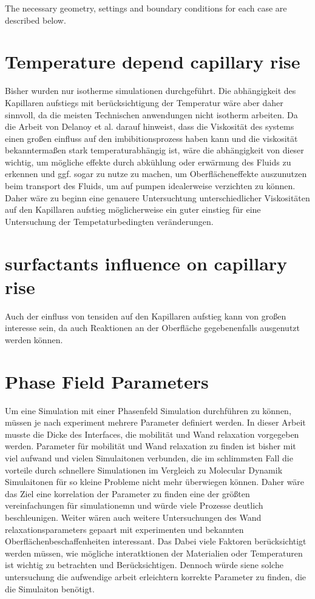 The necessary geometry, settings and boundary conditions for each case are described below. 

\section{Temperature depend capillary rise}
Bisher wurden nur isotherme simulationen durchgeführt. Die abhängigkeit des Kapillaren aufstiegs mit berücksichtigung der Temperatur wäre aber daher sinnvoll, da die meisten Technischen anwendungen nicht isotherm arbeiten. Da die Arbeit von Delanoy et al. \cite{delannoy2019DualRoleViscosity} darauf hinweist, dass die Viskosität des systems einen großen einfluss auf den imbibitionsprozess haben kann und die viskosität bekanntermaßen stark temperaturabhängig ist, wäre die abhängigkeit von dieser wichtig, um mögliche effekte durch abkühlung oder erwärmung des Fluids zu erkennen und ggf. sogar zu nutze zu machen, um Oberflächeneffekte auszunutzen beim transport des Fluids, um auf pumpen idealerweise verzichten zu können. 
Daher wäre zu beginn eine genauere Untersuchtung unterschiedlicher Viskositäten auf den Kapillaren aufstieg möglicherweise ein guter einstieg für eine Untersuchung der Tempetaturbedingten veränderungen. 


\section{surfactants influence on capillary rise}
Auch der einfluss von tensiden auf den Kapillaren aufstieg kann von großen interesse sein, da auch Reaktionen an der Oberfläche gegebenenfalls ausgenutzt werden können.

\section{Phase Field Parameters}
Um eine Simulation mit einer Phasenfeld Simulation durchführen zu können, müssen je nach experiment mehrere Parameter definiert werden. In dieser Arbeit musste die Dicke des Interfaces, die mobilität und Wand relaxation vorgegeben werden. Parameter für mobilität und Wand relaxation zu finden ist bisher mit viel aufwand und vielen Simulaitonen verbunden, die im schlimmsten Fall die vorteile durch schnellere Simulationen im Vergleich zu Molecular Dynamik Simulaitonen für so kleine Probleme nicht mehr überwiegen können. Daher wäre das Ziel eine korrelation der Parameter zu finden eine der größten vereinfachungen für simulationemn und würde viele Prozesse deutlich beschleunigen. Weiter wären auch weitere Untersuchungen des Wand relaxationsparameters gepaart mit experimenten und bekannten Oberflächenbeschaffenheiten interessant. Das Dabei viele Faktoren berücksichtigt werden müssen, wie mögliche interatktionen der Materialien oder Temperaturen ist wichtig zu betrachten und Berücksichtigen. Dennoch würde siene solche untersuchung die aufwendige arbeit erleichtern korrekte Parameter zu finden, die die Simulaiton benötigt. 